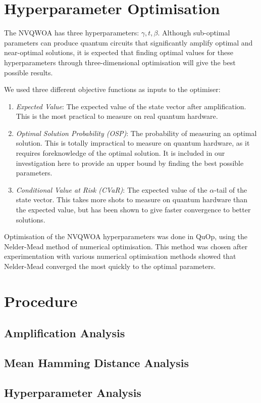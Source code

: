 \section{Hyperparameter Optimisation}
The NVQWOA has three hyperparameters: $\gamma, t, \beta$. Although sub-optimal parameters can produce quantum circuits that significantly amplify optimal and near-optimal solutions, it is expected that finding optimal values for these hyperparameters through three-dimensional optimisation will give the best possible results.\cite{bennett2024analysisnonvariationalquantumwalkbased}
 
We used three different objective functions as inputs to the optimiser:
\begin{enumerate}
    \item \textit{Expected Value}: The expected value of the state vector after amplification. This is the most practical to measure on real quantum hardware.
    \item \textit{Optimal Solution Probability (OSP)}: The probability of measuring an optimal solution. This is totally impractical to measure on quantum hardware, as it requires foreknowledge of the optimal solution. It is included in our investigation here to provide an upper bound by finding the best possible parameters.
    \item \textit{Conditional Value at Risk (CVaR)}: The expected value of the $\alpha$-tail of the state vector. This takes more shots to measure on quantum hardware than the expected value, but has been shown to give faster convergence to better solutions.\cite{CVaR_quantum}
\end{enumerate}
Optimisation of the NVQWOA hyperparameters was done in QuOp, using the Nelder-Mead method of numerical optimisation\cite{nelder_mead}. This method was chosen after experimentation with various numerical optimisation methods showed that Nelder-Mead converged the most quickly to the optimal parameters.

\section{Procedure}
\subsection{Amplification Analysis}

\subsection{Mean Hamming Distance Analysis}

\subsection{Hyperparameter Analysis}